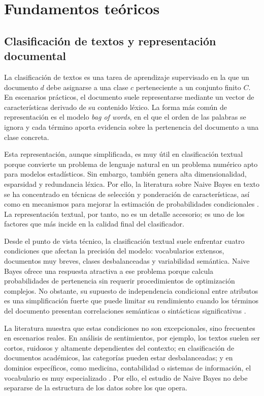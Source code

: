 \section{Fundamentos teóricos}

\subsection{Clasificación de textos y representación documental}

La clasificación de textos es una tarea de aprendizaje supervisado en la que un documento $d$ debe asignarse a una clase $c$ perteneciente a un conjunto finito $C$. En escenarios prácticos, el documento suele representarse mediante un vector de características derivado de su contenido léxico. La forma más común de representación es el modelo \textit{bag of words}, en el que el orden de las palabras se ignora y cada término aporta evidencia sobre la pertenencia del documento a una clase concreta.

Esta representación, aunque simplificada, es muy útil en clasificación textual porque convierte un problema de lenguaje natural en un problema numérico apto para modelos estadísticos. Sin embargo, también genera alta dimensionalidad, esparsidad y redundancia léxica. Por ello, la literatura sobre Naive Bayes en texto se ha concentrado en técnicas de selección y ponderación de características, así como en mecanismos para mejorar la estimación de probabilidades condicionales \cite{CHEN20095432,YOUN2009477,ZHANG2016137,Tang20162508,Ruan202020151}. La representación textual, por tanto, no es un detalle accesorio; es uno de los factores que más incide en la calidad final del clasificador.

Desde el punto de vista técnico, la clasificación textual suele enfrentar cuatro condiciones que afectan la precisión del modelo: vocabularios extensos, documentos muy breves, clases desbalanceadas y variabilidad semántica. Naive Bayes ofrece una respuesta atractiva a ese problema porque calcula probabilidades de pertenencia sin requerir procedimientos de optimización complejos. No obstante, su supuesto de independencia condicional entre atributos es una simplificación fuerte que puede limitar su rendimiento cuando los términos del documento presentan correlaciones semánticas o sintácticas significativas \cite{Ganiz20111022,Gan2021,Tang20161602}.

La literatura muestra que estas condiciones no son excepcionales, sino frecuentes en escenarios reales. En análisis de sentimientos, por ejemplo, los textos suelen ser cortos, ruidosos y altamente dependientes del contexto; en clasificación de documentos académicos, las categorías pueden estar desbalanceadas; y en dominios específicos, como medicina, contabilidad o sistemas de información, el vocabulario es muy especializado \cite{Sangounpao2019,Awotunde2023131,Pratmanto2020,Wang2007,Humaidi2023}. Por ello, el estudio de Naive Bayes no debe separarse de la estructura de los datos sobre los que opera.

